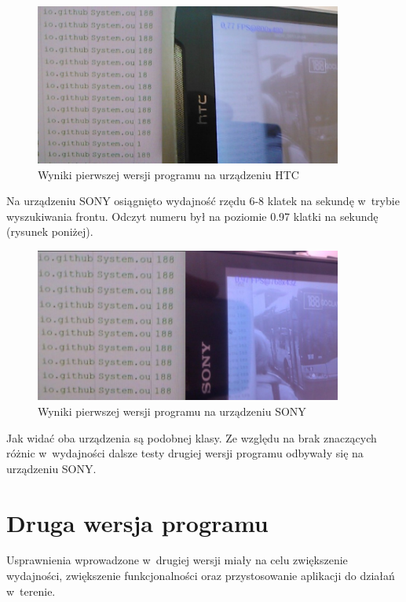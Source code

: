 \begin{figure}[h!]
    \caption{Wyniki pierwszej wersji programu na urządzeniu HTC}
    \centering
    \includegraphics[width=0.9\textwidth]{img/imp_htc_v1}
\end{figure}

Na urządzeniu SONY osiągnięto wydajność rzędu 6-8 klatek na sekundę
w~trybie wyszukiwania frontu. Odczyt numeru był na poziomie 0.97
klatki na sekundę (rysunek poniżej).

\begin{figure}[h!]
    \caption{Wyniki pierwszej wersji programu na urządzeniu SONY}
    \centering
    \includegraphics[width=0.9\textwidth]{img/imp_sony_v1}
\end{figure}

Jak widać oba urządzenia są podobnej klasy. Ze względu na brak
znaczących różnic w~wydajności dalsze testy drugiej wersji 
programu odbywały się na urządzeniu SONY.

\section{Druga wersja programu}

Usprawnienia wprowadzone w~drugiej wersji miały na celu zwiększenie
wydajności, zwiększenie funkcjonalności oraz przystosowanie 
aplikacji do działań w~terenie.

